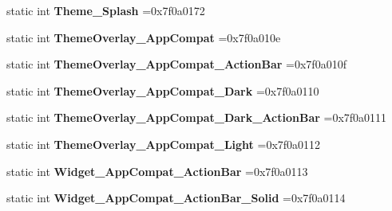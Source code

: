 \begin{DoxyCompactItemize}
static int {\bfseries Theme\+\_\+\+Splash} =0x7f0a0172
\item 
\mbox{\label{classandroid_1_1support_1_1graphics_1_1drawable_1_1R_1_1style_ae94112e2e66fc8ad53f73edc4cc98c42}} 
static int {\bfseries Theme\+Overlay\+\_\+\+App\+Compat} =0x7f0a010e
\item 
\mbox{\label{classandroid_1_1support_1_1graphics_1_1drawable_1_1R_1_1style_adbdd9b2cb85ac7774bf029f979b666f9}} 
static int {\bfseries Theme\+Overlay\+\_\+\+App\+Compat\+\_\+\+Action\+Bar} =0x7f0a010f
\item 
\mbox{\label{classandroid_1_1support_1_1graphics_1_1drawable_1_1R_1_1style_ac8932bdc32d18565fe7c51a834768d91}} 
static int {\bfseries Theme\+Overlay\+\_\+\+App\+Compat\+\_\+\+Dark} =0x7f0a0110
\item 
\mbox{\label{classandroid_1_1support_1_1graphics_1_1drawable_1_1R_1_1style_a94244f33e3ebe6ea59a6742dc910dccb}} 
static int {\bfseries Theme\+Overlay\+\_\+\+App\+Compat\+\_\+\+Dark\+\_\+\+Action\+Bar} =0x7f0a0111
\item 
\mbox{\label{classandroid_1_1support_1_1graphics_1_1drawable_1_1R_1_1style_a36a40b2312eaeaf04948e9c20bacbc17}} 
static int {\bfseries Theme\+Overlay\+\_\+\+App\+Compat\+\_\+\+Light} =0x7f0a0112
\item 
\mbox{\label{classandroid_1_1support_1_1graphics_1_1drawable_1_1R_1_1style_ac1fffd365e27e247726a2395e2d8ef06}} 
static int {\bfseries Widget\+\_\+\+App\+Compat\+\_\+\+Action\+Bar} =0x7f0a0113
\item 
\mbox{\label{classandroid_1_1support_1_1graphics_1_1drawable_1_1R_1_1style_ac34f3d39dd993f69e26d9d6d428bbe68}} 
static int {\bfseries Widget\+\_\+\+App\+Compat\+\_\+\+Action\+Bar\+\_\+\+Solid} =0x7f0a0114
\item 
\mbox{\label{classandroid_1_1support_1_1graphics_1_1drawable_1_1R_1_1style_a954b98e55e4e025f9096c3593811716c}} 

\end{DoxyCompactItemize}
